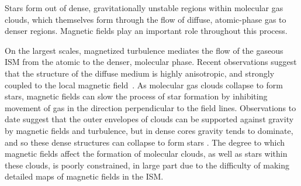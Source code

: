 \documentclass[PICOReport.tex]{subfiles}
\begin{document}
Stars form out of dense, gravitationally unstable regions within molecular gas clouds, which themselves form through the flow of diffuse, atomic-phase gas to denser regions. Magnetic fields play an important role throughout this process. 

On the largest scales, magnetized turbulence mediates the flow of the gaseous \ac{ISM} from the atomic to the denser, molecular phase. Recent observations suggest that the structure of the diffuse medium is highly anisotropic, and strongly coupled to the local magnetic field~\citep{Clark:2014, Clark:2015, Kalberla:2016, KalberlaKerp:2016}. As molecular gas clouds collapse to form stars, magnetic fields can slow the process of star formation by inhibiting movement of gas in the direction perpendicular to the field lines. Observations to date suggest that the outer envelopes of clouds can be supported against gravity by magnetic fields and turbulence, but in dense cores gravity tends to dominate, and so these dense structures can collapse to form stars \citep{Crutcher2010}.  The degree to which magnetic fields affect the formation of molecular clouds, as well as stars within these clouds, is poorly constrained, in large part due to the difficulty of making detailed maps of magnetic fields in the ISM.


\end{document}
